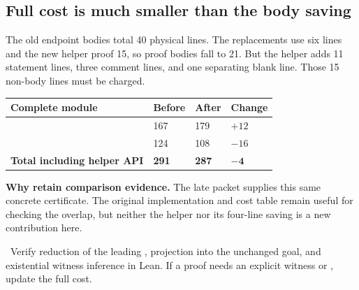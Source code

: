\subsection{Full cost is much smaller than the body saving}
The old endpoint bodies total 40 physical lines. The replacements use six lines and the new helper proof 15, so proof bodies fall to 21. But the helper adds 11 statement lines, three comment lines, and one separating blank line. Those 15 non-body lines must be charged.

\begin{tabularx}{\linewidth}{@{}Y R{0.8in}R{0.8in}R{0.8in}@{}}
\toprule
Complete module & Before & After & Change \\
\midrule
{} & 167 & 179 & $+12$ \\
 & 124 & 108 & $-16$ \\
\midrule
\textbf{Total including helper API} & \textbf{291} & \textbf{287} & $\mathbf{-4}$ \\
\bottomrule
\end{tabularx}

\textbf{Why retain comparison evidence.} The late packet supplies this same concrete certificate. The original implementation and cost table remain useful for checking the overlap, but neither the helper nor its four-line saving is a new contribution here.

\risk\ Verify reduction of the leading , projection into the unchanged  goal, and existential witness inference in Lean. If a proof needs an explicit witness or , update the full cost. \status
